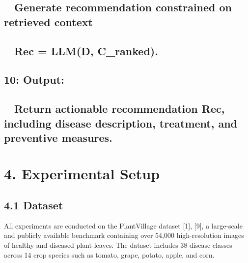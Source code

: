 \subsection*{ Generate recommendation constrained on retrieved
context}\label{generate-recommendation-constrained-on-retrieved-context}

\subsection*{ Rec = LLM(D, C\_ranked).}\label{rec-llmd-c_ranked.}

\subsection*{10: Output:}\label{output}

\subsection*{ Return actionable recommendation Rec, including disease
description, treatment, and preventive
measures.}\label{return-actionable-recommendation-rec-including-disease-description-treatment-and-preventive-measures.}

\subsection*{}\label{section}

\section*{4. Experimental Setup}\label{experimental-setup}

\subsection*{4.1 Dataset}\label{dataset}

All experiments are conducted on the PlantVillage dataset {[}1{]},
{[}9{]}, a large-scale and publicly available benchmark containing over
54,000 high-resolution images of healthy and diseased plant leaves. The
dataset includes 38 disease classes across 14 crop species such as
tomato, grape, potato, apple, and corn.

